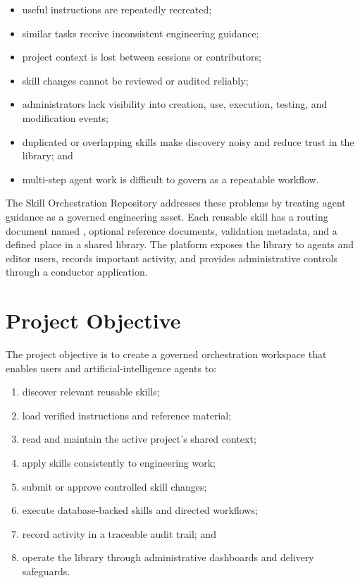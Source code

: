 \documentclass[12pt]{report}
\begin{document}
\begin{itemize}
  \item useful instructions are repeatedly recreated;
  \item similar tasks receive inconsistent engineering guidance;
  \item project context is lost between sessions or contributors;
  \item skill changes cannot be reviewed or audited reliably;
  \item administrators lack visibility into creation, use, execution, testing, and modification events;
  \item duplicated or overlapping skills make discovery noisy and reduce trust in the library; and
  \item multi-step agent work is difficult to govern as a repeatable workflow.
\end{itemize}

The Skill Orchestration Repository addresses these problems by treating agent guidance as a governed engineering asset. Each reusable skill has a routing document named , optional reference documents, validation metadata, and a defined place in a shared library. The platform exposes the library to agents and editor users, records important activity, and provides administrative controls through a conductor application.

\section{Project Objective}

The project objective is to create a governed orchestration workspace that enables users and artificial-intelligence agents to:

\begin{enumerate}
  \item discover relevant reusable skills;
  \item load verified instructions and reference material;
  \item read and maintain the active project's shared context;
  \item apply skills consistently to engineering work;
  \item submit or approve controlled skill changes;
  \item execute database-backed skills and directed workflows;
  \item record activity in a traceable audit trail; and
  \item operate the library through administrative dashboards and delivery safeguards.
\end{enumerate}
\end{document}
